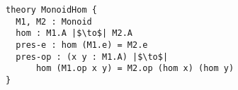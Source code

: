         \begin{verbatim}
theory MonoidHom { 
  M1, M2 : Monoid  
  hom : M1.A |$\to$| M2.A 
  pres-e : hom (M1.e) = M2.e
  pres-op : (x y : M1.A) |$\to$| 
      hom (M1.op x y) = M2.op (hom x) (hom y) 
}             
          \end{verbatim} 